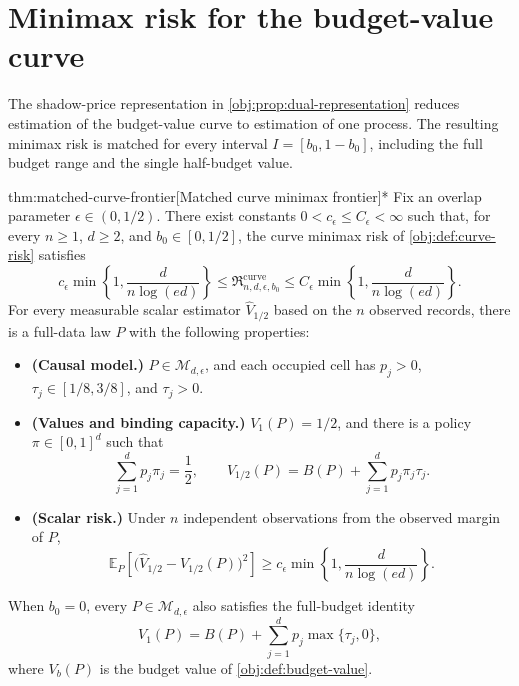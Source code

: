 \section{Minimax risk for the budget-value curve}

The shadow-price representation in \cref{obj:prop:dual-representation} reduces estimation of the budget-value curve to estimation of one process. The resulting minimax risk is matched for every interval \(I=[b_0,1-b_0]\), including the full budget range and the single half-budget value.

\begin{theoremv}{thm:matched-curve-frontier}[Matched curve minimax frontier]*
Fix an overlap parameter \(\epsilon\in(0,1/2)\). There exist constants \(0<c_\epsilon\le C_\epsilon<\infty\) such that, for every \(n\ge1\), \(d\ge2\), and \(b_0\in[0,1/2]\), the curve minimax risk of \cref{obj:def:curve-risk} satisfies
\[
c_\epsilon\min\left\{1,\frac{d}{n\log(ed)}\right\}
\le \mathfrak R_{n,d,\epsilon,b_0}^{\mathrm{curve}}
\le C_\epsilon\min\left\{1,\frac{d}{n\log(ed)}\right\}.
\]
For every measurable scalar estimator \(\widehat V_{1/2}\) based on the \(n\) observed records, there is a full-data law \(P\) with the following properties:
\begin{itemize}
\item \textbf{(Causal model.)} \(P\in\mathcal M_{d,\epsilon}\), and each occupied cell has \(p_j>0\), \(\tau_j\in[1/8,3/8]\), and \(\tau_j>0\).
\item \textbf{(Values and binding capacity.)} \(V_1(P)=1/2\), and there is a policy \(\pi\in[0,1]^d\) such that
\[
\sum_{j=1}^{d}p_j\pi_j=\frac12,
\qquad
V_{1/2}(P)=B(P)+\sum_{j=1}^{d}p_j\pi_j\tau_j.
\]
\item \textbf{(Scalar risk.)} Under \(n\) independent observations from the observed margin of \(P\),
\[
\mathbb E_P\!\left[\bigl(\widehat V_{1/2}-V_{1/2}(P)\bigr)^2\right]
\ge c_\epsilon\min\left\{1,\frac{d}{n\log(ed)}\right\}.
\]
\end{itemize}
When \(b_0=0\), every \(P\in\mathcal M_{d,\epsilon}\) also satisfies the full-budget identity
\[
V_1(P)=B(P)+\sum_{j=1}^{d}p_j\max\{\tau_j,0\},
\]
where \(V_b(P)\) is the budget value of \cref{obj:def:budget-value}.
\end{theoremv}

